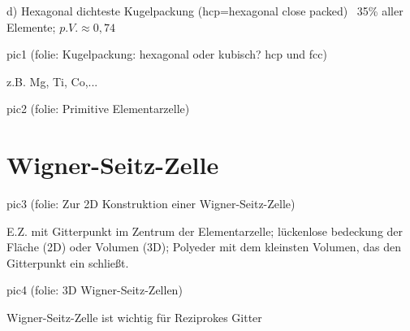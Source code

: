 d) Hexagonal dichteste Kugelpackung (hcp=hexagonal close packed)
~35\% aller Elemente; \(p.V.\approx 0,74\)

pic1 (folie: Kugelpackung: hexagonal oder kubisch? hcp und fcc)

z.B. Mg, Ti, Co,...

pic2 (folie: Primitive Elementarzelle)

\section{Wigner-Seitz-Zelle}

pic3 (folie: Zur 2D Konstruktion einer Wigner-Seitz-Zelle)

E.Z. mit Gitterpunkt im Zentrum der Elementarzelle; lückenlose bedeckung der
Fläche (2D) oder Volumen (3D); Polyeder mit dem kleinsten Volumen, das den
Gitterpunkt ein schließt.

pic4 (folie: 3D Wigner-Seitz-Zellen)

Wigner-Seitz-Zelle ist wichtig für Reziprokes Gitter








